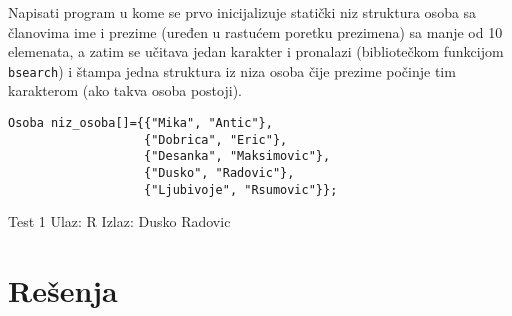 \begin{Exercise}[label=407]
  Napisati program u kome se prvo inicijalizuje statički niz
  struktura osoba sa članovima ime i prezime (uređen u
  rastućem poretku prezimena) sa manje od 10 elemenata, a zatim se
  učitava jedan karakter i pronalazi (bibliotečkom funkcijom
  \verb|bsearch|) i štampa jedna struktura iz niza osoba čije
  prezime počinje tim karakterom (ako takva osoba postoji).
\begin{verbatim}
Osoba niz_osoba[]={{"Mika", "Antic"},
                   {"Dobrica", "Eric"},
                   {"Desanka", "Maksimovic"},
                   {"Dusko", "Radovic"},
                   {"Ljubivoje", "Rsumovic"}};
\end{verbatim}
  
\begin{minitest}
\begin{test}{Test 1}
Ulaz:  R
Izlaz: Dusko Radovic
\end{test}
\end{minitest}
  
\end{Exercise}


\section{Rešenja}

\shipoutAnswer


